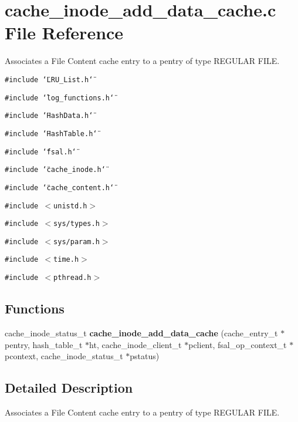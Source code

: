 \section{cache\_\-inode\_\-add\_\-data\_\-cache.c File Reference}
\label{cache__inode__add__data__cache_8c}
Associates a File Content cache entry to a pentry of type REGULAR FILE. 

{\tt \#include \char`\"{}LRU\_\-List.h\char`\"{}}\par
{\tt \#include \char`\"{}log\_\-functions.h\char`\"{}}\par
{\tt \#include \char`\"{}Hash\-Data.h\char`\"{}}\par
{\tt \#include \char`\"{}Hash\-Table.h\char`\"{}}\par
{\tt \#include \char`\"{}fsal.h\char`\"{}}\par
{\tt \#include \char`\"{}cache\_\-inode.h\char`\"{}}\par
{\tt \#include \char`\"{}cache\_\-content.h\char`\"{}}\par
{\tt \#include $<$unistd.h$>$}\par
{\tt \#include $<$sys/types.h$>$}\par
{\tt \#include $<$sys/param.h$>$}\par
{\tt \#include $<$time.h$>$}\par
{\tt \#include $<$pthread.h$>$}\par
\subsection*{Functions}
\begin{CompactItemize}
\item 
cache\_\-inode\_\-status\_\-t {\bf cache\_\-inode\_\-add\_\-data\_\-cache} (cache\_\-entry\_\-t $\ast$pentry, hash\_\-table\_\-t $\ast$ht, cache\_\-inode\_\-client\_\-t $\ast$pclient, fsal\_\-op\_\-context\_\-t $\ast$pcontext, cache\_\-inode\_\-status\_\-t $\ast$pstatus)
\end{CompactItemize}


\subsection{Detailed Description}
Associates a File Content cache entry to a pentry of type REGULAR FILE. 

